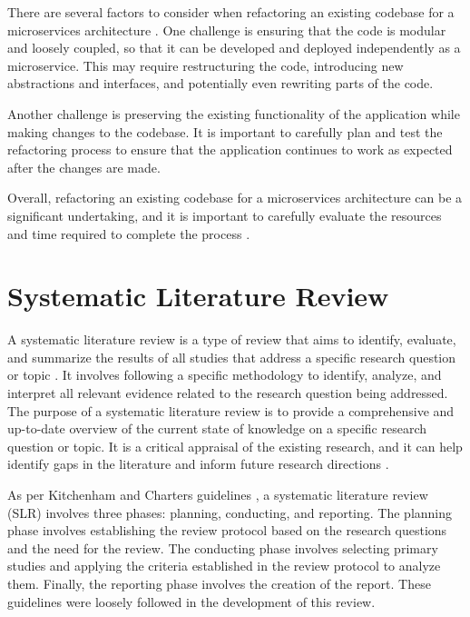 \documentclass[conference]{IEEEtran}
\begin{document}
There are several factors to consider when refactoring an existing codebase for
a microservices architecture \cite{newman2019monolith}. One challenge is
ensuring that the code is modular and loosely coupled, so that it can be
developed and deployed independently as a microservice. This may require
restructuring the code, introducing new abstractions and interfaces, and
potentially even rewriting parts of the code.

Another challenge is preserving the existing functionality of the application
while making changes to the codebase. It is important to carefully plan and
test the refactoring process to ensure that the application continues to work
as expected after the changes are made.

Overall, refactoring an existing codebase for a microservices architecture can
be a significant undertaking, and it is important to carefully evaluate the
resources and time required to complete the process \cite{newman2019monolith}.

\section{Systematic Literature Review}

A systematic literature review is a type of review that aims to identify,
evaluate, and summarize the results of all studies that address a specific
research question or topic 
 . It involves
following a specific methodology to identify, analyze, and interpret all
relevant evidence related to the research question being addressed. The purpose
of a systematic literature review is to provide a comprehensive and up-to-date
overview of the current state of knowledge on a specific research question or
topic. It is a critical appraisal of the existing research, and it can help
identify gaps in the literature and inform future research directions
.

As per Kitchenham and Charters guidelines , a
systematic literature review (SLR) involves three phases: planning, conducting,
and reporting. The planning phase involves establishing the review protocol
based on the research questions and the need for the review. The conducting
phase involves selecting primary studies and applying the criteria established
in the review protocol to analyze them. Finally, the reporting phase involves
the creation of the report. These guidelines were loosely followed in the
development of this review.
\end{document}
